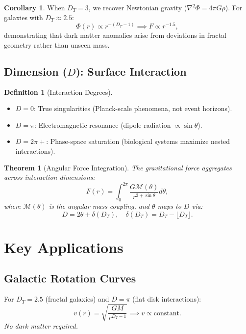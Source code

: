 \documentclass[prd,superscriptaddress]{revtex4-2}
\theoremstyle{plain}
\newtheorem{theorem}{Theorem}[section]  %
\theoremstyle{definition}
\newtheorem{definition}{Definition}[section]  %
\theoremstyle{corollary}
\newtheorem{corollary}{Corollary}[section]
\begin{document}
\begin{corollary}
When $D_T = 3$, we recover Newtonian gravity ($\nabla^2 \Phi = 4\pi G\rho$). For galaxies with $D_T \approx 2.5$:
\begin{equation}
\Phi(r) \propto r^{-(D_T - 1)} \implies F \propto r^{-1.5},
\end{equation}
demonstrating that dark matter anomalies arise from deviations in fractal geometry rather than unseen mass.
\end{corollary}

\subsection{Dimension ($D$): Surface Interaction}
\begin{definition}[Interaction Degrees]
\begin{itemize}
\item $D = 0$: True singularities (Planck-scale phenomena, not event horizons).
\item $D = \pi$: Electromagnetic resonance (dipole radiation $\propto \sin\theta$).
\item $D = 2\pi+$: Phase-space saturation (biological systems maximize nested interactions).
\end{itemize}
\end{definition}

\begin{theorem}[Angular Force Integration]
The gravitational force aggregates across interaction dimensions:
\begin{equation}
F(r) = \int_{0}^{2\pi} \frac{G \mathcal{M}(\theta)}{r^{2 + \sin\theta}} d\theta,
\end{equation}
where $\mathcal{M}(\theta)$ is the angular mass coupling, and $\theta$ maps to $D$ via:
\begin{equation}
D = 2\theta + \delta(D_T), \quad \delta(D_T) = D_T - \lfloor D_T \rfloor.
\end{equation}
\end{theorem}



\section{Key Applications}
\subsection{Galactic Rotation Curves}
For \(D_T = 2.5\) (fractal galaxies) and \(D = \pi\) (flat disk interactions):
\begin{equation}
v(r) = \sqrt{\frac{G M}{r^{D_T - 1}}} \implies v \propto \text{constant}.
\end{equation}
\textit{No dark matter required.}
\end{document}
